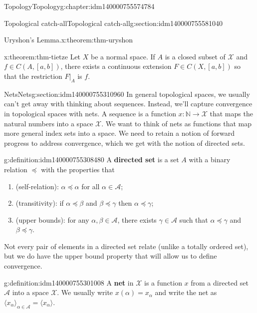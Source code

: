 \documentclass[oneside,10pt,]{book}
\newcommand{\terminology}[1]{\textbf{#1}}
\numberwithin{equation}{section}
\newcommand{\X}{\mathcal{X}}
\numberwithin{equation}{section}
\begin{document}
\begin{chapterptx}{Topology}{}{Topology}{}{}{g:chapter:idm140000755574784}
\begin{sectionptx}{Topological catch-all}{}{Topological catch-all}{}{}{g:section:idm140000755581040}
\begin{theorem}{Uryshon's Lemma.}{}{x:theorem:thm-uryshon}
\end{theorem}
\begin{theorem}{}{}{x:theorem:thm-tietze}%
Let \(X\) be a normal space. If \(A\) is a closed subset of \(\X\) and \(f \in C(A, [a,b])\), there exists a continuous extension \(F \in C(X, [a,b])\) so that the restriction \(F\vert_A\) is \(f\).%
\end{theorem}
\end{sectionptx}
%
%
\typeout{************************************************}
\typeout{************************************************}
%
\begin{sectionptx}{Nets}{}{Nets}{}{}{g:section:idm140000755310960}
In general topological spaces, we usually can't get away with thinking about sequences. Instead, we'll capture convergence in topological spaces with nets. A sequence is a function \(x: \mathbb{N} \to \mathcal{X}\) that maps the natural numbers into a space \(\mathcal{X}\). We want to think of nets as functions that map more general index sets into a space. We need to retain a notion of forward progress to address convergence, which we get with the notion of directed sets.%
\begin{definition}{}{g:definition:idm140000755308480}%
A \terminology{directed set} is a set \(A\) with a binary relation \(\preceq\) with the properties that%
\begin{enumerate}
\item{}(self-relation): \(\alpha \preceq \alpha\) for all \(\alpha \in \mathcal{A}\);%
\item{}(transitivity): if \(\alpha \preceq \beta\) and \(\beta \preceq  \gamma\) then \(\alpha \preceq \gamma\);%
\item{}(upper bounds): for any \(\alpha, \beta \in \mathcal{A}\), there exists \(\gamma \in \mathcal{A}\) such that \(\alpha \preceq \gamma\) and \(\beta \preceq \gamma\).%
\end{enumerate}
%
\end{definition}
Not every pair of elements in a directed set relate (unlike a totally ordered set), but we do have the upper bound property that will allow us to define convergence.%
\begin{definition}{}{g:definition:idm140000755301008}%
A \terminology{net} in \(\mathcal{X}\) is a function \(x\) from a directed set \(\mathcal{A}\) into a space \(\mathcal{X}\). We usually write \(x(\alpha) = x_\alpha\) and write the net as \(\langle x_\alpha \rangle_{\alpha \in \mathcal A} = \langle x_\alpha \rangle\).%
\end{definition}

\end{sectionptx}
\end{chapterptx}
\end{document}
